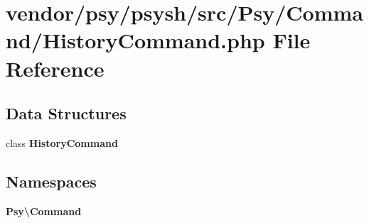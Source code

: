 \section{vendor/psy/psysh/src/\+Psy/\+Command/\+History\+Command.php File Reference}
\label{_history_command_8php}
\subsection*{Data Structures}
\begin{DoxyCompactItemize}
\item 
class {\bf History\+Command}
\end{DoxyCompactItemize}
\subsection*{Namespaces}
\begin{DoxyCompactItemize}
\item 
 {\bf Psy\textbackslash{}\+Command}
\end{DoxyCompactItemize}
